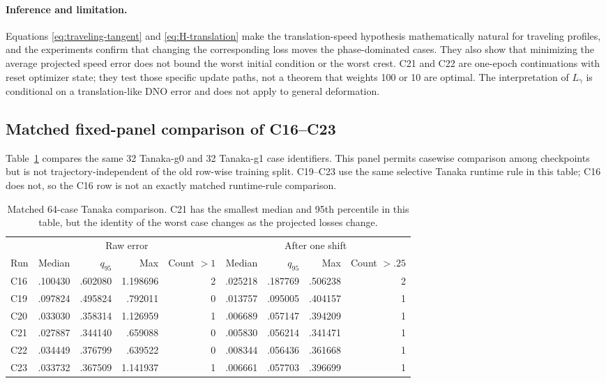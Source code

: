 \documentclass[11pt]{article}
\begin{document}
\paragraph{Inference and limitation.}
Equations \eqref{eq:traveling-tangent} and \eqref{eq:H-translation} make the
translation-speed hypothesis mathematically natural for traveling profiles,
and the experiments confirm that changing the corresponding loss moves the
phase-dominated cases.  They also show that minimizing the average projected
speed error does not bound the worst initial condition or the worst crest.
C21 and C22 are one-epoch continuations with reset optimizer state; they test
those specific update paths, not a theorem that weights 100 or 10 are optimal.
The interpretation of $L_\gamma$ is conditional on a translation-like DNO
error and does not apply to general deformation.

\subsection{Matched fixed-panel comparison of C16--C23}

Table~\ref{tab:fixed64} compares the same 32 Tanaka-g0 and 32 Tanaka-g1 case
identifiers.  This panel permits casewise comparison among checkpoints but is
not trajectory-independent of the old row-wise training split.  C19--C23 use
the same selective Tanaka runtime rule in this table; C16 does not, so the C16
row is not an exactly matched runtime-rule comparison.

\begin{table}[htbp]
\centering
\small
\begin{tabular}{lrrrrrrrr}
\toprule
& \multicolumn{4}{c}{Raw error} & \multicolumn{4}{c}{After one shift} \\
Run & Median & $q_{95}$ & Max & Count $>1$ & Median & $q_{95}$ & Max & Count $>.25$ \\
\midrule
C16 & .100430 & .602080 & 1.198696 & 2 & .025218 & .187769 & .506238 & 2 \\
C19 & .097824 & .495824 & .792011 & 0 & .013757 & .095005 & .404157 & 1 \\
C20 & .033030 & .358314 & 1.126959 & 1 & .006689 & .057147 & .394209 & 1 \\
C21 & .027887 & .344140 & .659088 & 0 & .005830 & .056214 & .341471 & 1 \\
C22 & .034449 & .376799 & .639522 & 0 & .008344 & .056436 & .361668 & 1 \\
C23 & .033732 & .367509 & 1.141937 & 1 & .006661 & .057703 & .396699 & 1 \\
\bottomrule
\end{tabular}
\caption{Matched 64-case Tanaka comparison.  C21 has the smallest median and
95th percentile in this table, but the identity of the worst case changes as
the projected losses change.}
\label{tab:fixed64}
\end{table}
\end{document}
